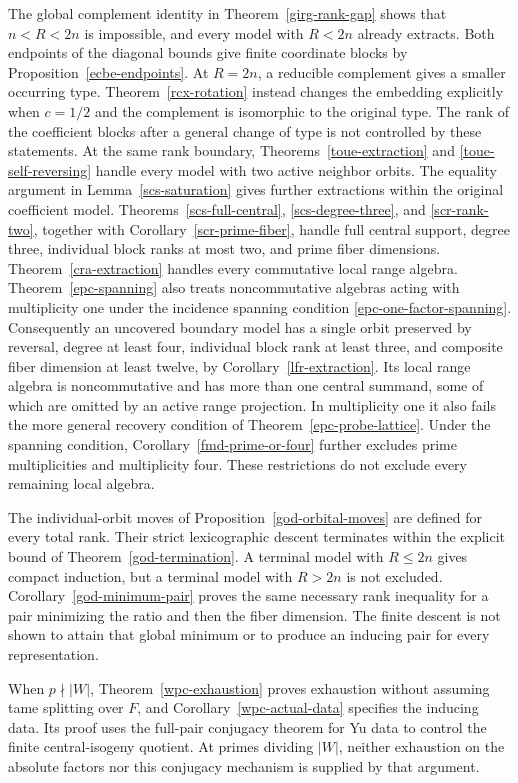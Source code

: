 \documentclass[10pt]{amsart}
\begin{document}
The global complement identity in Theorem~\ref{girg-rank-gap} shows that
$n<R<2n$ is impossible, and every model with $R<2n$ already extracts.
Both endpoints of the diagonal bounds give finite coordinate blocks by
Proposition~\ref{ecbe-endpoints}. At $R=2n$, a reducible complement gives
a smaller occurring type. Theorem~\ref{rcx-rotation} instead changes the
embedding explicitly when $c=1/2$ and the complement is isomorphic to the
original type. The rank of the coefficient blocks after a general change
of type is not controlled by these statements. At the same rank boundary,
Theorems~\ref{toue-extraction} and \ref{toue-self-reversing} handle every
model with two active neighbor orbits. The equality argument in
Lemma~\ref{scs-saturation} gives further extractions within the original
coefficient model. Theorems~\ref{scs-full-central}, \ref{scs-degree-three},
and \ref{scr-rank-two}, together with Corollary~\ref{scr-prime-fiber},
handle full central support, degree three, individual block ranks at most
two, and prime fiber dimensions. Theorem~\ref{cra-extraction} handles every
commutative local range algebra. Theorem~\ref{epc-spanning} also treats
noncommutative algebras acting with multiplicity one under the incidence
spanning condition \eqref{epc-one-factor-spanning}. Consequently an
uncovered boundary model has a single
orbit preserved by reversal, degree at least four, individual block rank
at least three, and composite fiber dimension at least twelve, by
Corollary~\ref{lfr-extraction}. Its local range algebra is noncommutative and
has more than one central summand, some of which are omitted by an active
range projection. In multiplicity one it also fails the more general
recovery condition of Theorem~\ref{epc-probe-lattice}. Under the spanning
condition, Corollary~\ref{fmd-prime-or-four} further excludes prime
multiplicities and multiplicity four. These restrictions do not exclude
every remaining local algebra.

The individual-orbit moves of Proposition~\ref{god-orbital-moves} are
defined for every total rank. Their strict lexicographic descent terminates
within the explicit bound of Theorem~\ref{god-termination}. A terminal
model with $R\leq2n$ gives compact induction, but a terminal model with
$R>2n$ is not excluded. Corollary~\ref{god-minimum-pair} proves the same
necessary rank inequality for a pair minimizing the ratio and then the
fiber dimension. The finite descent is not shown to attain that global
minimum or to produce an inducing pair for every representation.

When $p\nmid|W|$, Theorem~\ref{wpc-exhaustion} proves exhaustion without
assuming tame splitting over $F$, and Corollary~\ref{wpc-actual-data}
specifies the inducing data. Its proof uses the full-pair conjugacy theorem
for Yu data to control the finite central-isogeny quotient. At primes
dividing $|W|$, neither exhaustion on the absolute factors nor this
conjugacy mechanism is supplied by that argument.
\end{document}
